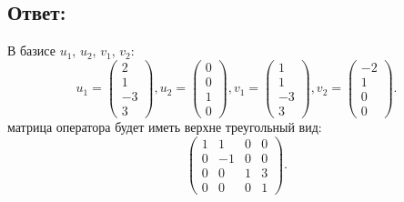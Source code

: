 \documentclass[12pt]{article}
\begin{document}
    \subsection*{Ответ:}
    В базисе $u_1$, $u_2$, $v_1$, $v_2$:
    \[
        u_1 = \begin{pmatrix}
                  2 \\ 1 \\ -3 \\ 3
        \end{pmatrix},
        u_2 = \begin{pmatrix}
                  0 \\ 0 \\ 1 \\ 0
        \end{pmatrix},
        v_1 = \begin{pmatrix}
                  1 \\ 1 \\ -3 \\ 3
        \end{pmatrix},
        v_2 = \begin{pmatrix}
                  -2 \\ 1 \\ 0 \\ 0
        \end{pmatrix}.
    \]
    матрица оператора будет иметь верхне треугольный вид:
    \[
        \begin{pmatrix}
            1 & 1  & 0 & 0 \\
            0 & -1 & 0 & 0 \\
            0 & 0  & 1 & 3 \\
            0 & 0  & 0 & 1
        \end{pmatrix}
        .
    \]
\end{document}
